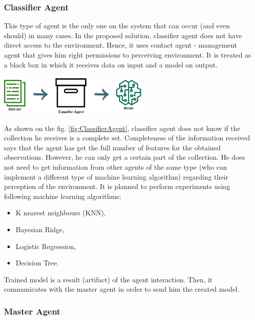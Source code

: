 \subsubsection{Classifier Agent}

This type of agent is the only one on the system that can occur (and even should) in many cases. In the proposed solution, classifier agent does not have direct access to the environment. Hence, it uses contact agent - management agent that gives him right permissions to perceiving environment. It is treated as a black box in which it receives data on input and a model on output.

\begin{center}
	\includegraphics[width=0.55\textwidth, keepaspectratio]{diagrams/black-box}
	\label{fig:ClassifierAgent}
\end{center}

As shown on the fig. \ref{fig:ClassifierAgent}, classifier agent does not know if the collection he receives is a complete set. Completeness of the information received says that the agent has get the full number of features for the obtained observations. However, he can only get a certain part of the collection. He does not need to get information from other agents of the same type (who can implement a different type of machine learning algorithm) regarding their perception of the environment. It is planned to perform experiments using following machine learning algorithms: 
\begin{itemize}
	\item K nearest neighbours (KNN), 
	\item Bayesian Ridge, 
	\item Logistic Regression, 
	\item Decision Tree.
\end{itemize} 

Trained model is a result (artifact) of the agent interaction. Then, it communicates with the master agent in order to send him the created model.

\subsubsection{Master Agent}

